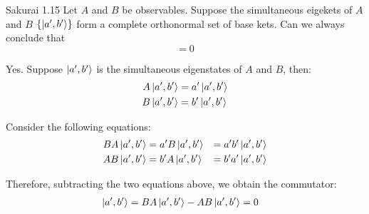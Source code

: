 \documentclass{article}
\begin{document}
\newpage
\begin{section}{Sakurai 1.15}
	Let $A$ and $B$ be observables. Suppose the simultaneous eigekets of $A$ and $B$ $\left\{\ket{a', b'}\right\}$ form a complete orthonormal set of base kets. Can we always conclude that
	\begin{equation*}
		[A, B] = 0
	\end{equation*}

	\begin{tcolorbox}
		Yes. Suppose $\ket{a', b'}$ is the simultaneous eigenstates of $A$ and $B$, then:
		\begin{align*}
			A\ket{a', b'} & = a' \ket{a', b'} \\
			B\ket{a', b'} & = b' \ket{a', b'}
		\end{align*}

		Consider the following equations:
		\begin{align*}
			BA\ket{a', b'} & = a' B\ket{a', b'} & = a'b' \ket{a', b'} \\
			AB\ket{a', b'} & = b' A\ket{a', b'} & = b'a' \ket{a', b'}
		\end{align*}

		Therefore, subtracting the two equations above, we obtain the commutator:
		\begin{align*}
			[A, B] \ket{a', b'} & = BA\ket{a', b'} - AB\ket{a', b'} = 0
		\end{align*}
	\end{tcolorbox}

\end{section}
\end{document}
